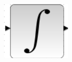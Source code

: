 \documentclass[12pt]{mwart}
\begin{document}
\begin{center}
\begin{minipage}{0.15\linewidth}
	\end{minipage}
	\hfill
	\begin{minipage}{0.15\linewidth}
		\includegraphics[width=\linewidth]{INTEGRAL_m.png}
	\end{minipage}
	

\end{center}
\end{document}
